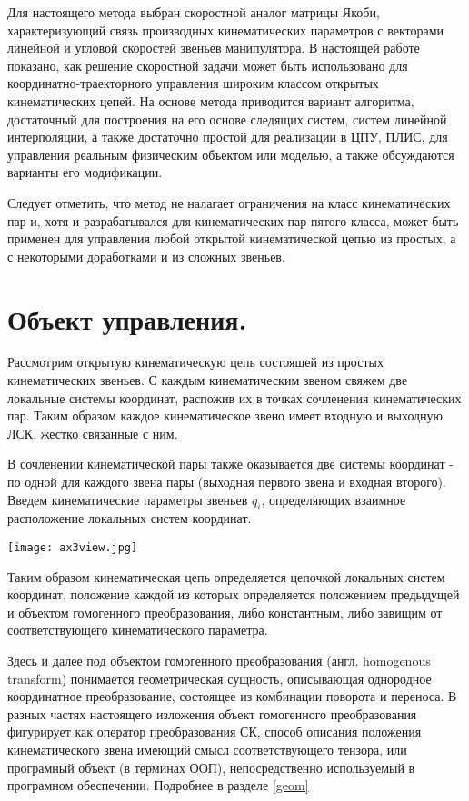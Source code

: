 \documentclass[12pt,a4paper,titlepage]{article}
\begin{document}
Для настоящего метода выбран скоростной аналог матрицы Якоби, характеризующий связь производных кинематических параметров с векторами линейной и угловой скоростей звеньев манипулятора. В настоящей работе показано, как решение скоростной задачи может быть использовано для координатно-траекторного управления широким классом открытых кинематических цепей. На основе метода приводится вариант алгоритма, достаточный для построения на его основе следящих систем, систем линейной интерполяции, а также достаточно простой для реализации в ЦПУ, ПЛИС, для управления реальным физическим объектом или моделью, а также обсуждаются варианты его модификации.

Следует отметить, что метод не налагает ограничения на класс кинематических пар и, хотя и разрабатывался для кинематических пар пятого класса, может быть применен для управления любой открытой кинематической цепью из простых, а с некоторыми доработками и из сложных звеньев.

\newpage
\section{Объект управления.}

Рассмотрим открытую кинематическую цепь состоящей из простых кинематических звеньев. С каждым кинематическим звеном свяжем две локальные системы координат, распожив их в точках сочленения кинематических пар. Таким образом каждое кинематическое звено имеет входную и выходную ЛСК, жестко связанные с ним.

В сочленении кинематической пары также оказывается две системы координат - по одной для каждого звена пары (выходная первого звена и входная второго). Введем кинематические параметры звеньев $q_i$, определяющих взаимное расположение локальных систем координат.

\begin{center}
  \texttt{[image: ax3view.jpg]}
  \label{}
\end{center}

Таким образом кинематическая цепь определяется цепочкой локальных систем координат, положение каждой из которых определяется положением предыдущей и объектом гомогенного преобразования, либо константным, либо завищим от соответствующего кинематического параметра.

\colorbox{shadecolor}
{\parbox{0.9\textwidth}{Здесь и далее под объектом гомогенного преобразования (англ. homogenous transform) понимается геометрическая сущность, описывающая однородное координатное преобразование, состоящее из комбинации поворота и переноса. В разных частях настоящего изложения объект гомогенного преобразования фигурирует как оператор преобразования СК, способ описания положения кинематического звена имеющий смысл соответствующего тензора, или програмный объект (в терминах ООП), непосредственно используемый в програмном обеспечении. Подробнее в разделе \ref{geom}}}
\end{document}
